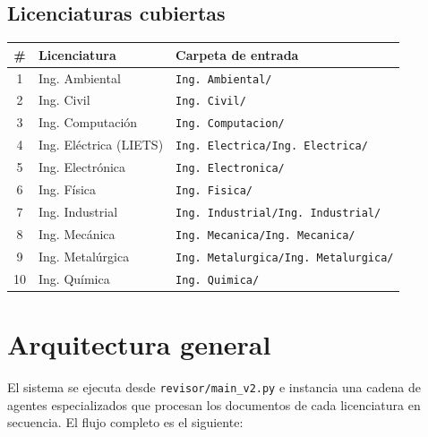 \documentclass[11pt,a4paper]{article}
\begin{document}
\subsection{Licenciaturas cubiertas}

\begin{center}
\begin{tabular}{clp{6cm}}
\toprule
\textbf{\#} & \textbf{Licenciatura} & \textbf{Carpeta de entrada} \\
\midrule
1  & Ing. Ambiental              & \texttt{Ing.\ Ambiental/} \\
2  & Ing. Civil                  & \texttt{Ing.\ Civil/} \\
3  & Ing. Computación            & \texttt{Ing.\ Computacion/} \\
4  & Ing. Eléctrica (LIETS)      & \texttt{Ing.\ Electrica/Ing.\ Electrica/} \\
5  & Ing. Electrónica            & \texttt{Ing.\ Electronica/} \\
6  & Ing. Física                 & \texttt{Ing.\ Fisica/} \\
7  & Ing. Industrial             & \texttt{Ing.\ Industrial/Ing.\ Industrial/} \\
8  & Ing. Mecánica               & \texttt{Ing.\ Mecanica/Ing.\ Mecanica/} \\
9  & Ing. Metalúrgica            & \texttt{Ing.\ Metalurgica/Ing.\ Metalurgica/} \\
10 & Ing. Química                & \texttt{Ing.\ Quimica/} \\
\bottomrule
\end{tabular}
\end{center}

\section{Arquitectura general}

El sistema se ejecuta desde \texttt{revisor/main\_v2.py} e instancia una cadena de agentes
especializados que procesan los documentos de cada licenciatura en secuencia.
El flujo completo es el siguiente:
\end{document}

